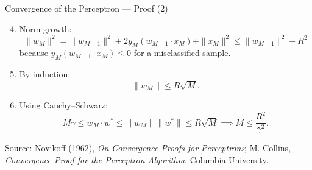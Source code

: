 \documentclass[serif, aspectratio=169]{beamer}
\begin{document}
    \begin{frame}{Convergence of the Perceptron — Proof (2)}

        \begin{enumerate}
            \setcounter{enumi}{3}
            \item Norm growth:
            \[
                \|w_M\|^2 = \|w_{M-1}\|^2 + 2y_M (w_{M-1}\cdot x_M) + \|x_M\|^2
                \le \|w_{M-1}\|^2 + R^2
            \]
            because $y_M (w_{M-1}\cdot x_M) \le 0$ for a misclassified sample.

            \item By induction:
            \[
                \|w_M\| \le R\sqrt{M}.
            \]

            \item Using Cauchy–Schwarz:
            \[
                M\gamma \le w_M \cdot w^* \le \|w_M\| \|w^*\| \le R\sqrt{M} \implies M \le \frac{R^2}{\gamma^2}.
            \]

        \end{enumerate}

        \vfill
        \footnotesize
        Source: Novikoff (1962), \textit{On Convergence Proofs for Perceptrons};
        M. Collins, \textit{Convergence Proof for the Perceptron Algorithm}, Columbia University.
    \end{frame}
\end{document}
